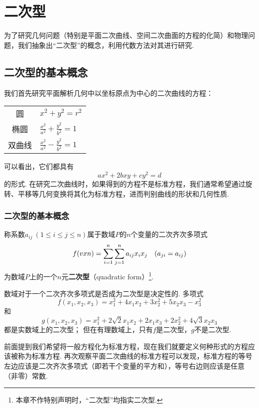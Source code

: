 \chapter{二次型}
为了研究几何问题（特别是平面二次曲线、空间二次曲面的方程的化简）和物理问题，我们抽象出“二次型”的概念，利用代数方法对其进行研究.

\section{二次型的基本概念}
我们首先研究平面解析几何中以坐标原点为中心的二次曲线的方程：
\begin{center}
\def\arraystretch{1.5}
\begin{tabular}{cl}
圆 & \(x^2+y^2=r^2\) \\
椭圆 & \(\frac{x^2}{a^2}+\frac{y^2}{b^2}=1\) \\
双曲线 & \(\frac{x^2}{a^2}-\frac{y^2}{b^2}=1\) \\
\end{tabular}
\end{center}

可以看出，它们都具有\[
a x^2 + 2b xy + c y^2 = d
\]的形式.
在研究二次曲线时，如果得到的方程不是标准方程，我们通常希望通过旋转、平移等几何变换将其化为标准方程，进而判别曲线的形状和几何性质.

\subsection{二次型的基本概念}
\begin{definition}
称系数\(a_{ij}\ (1 \leqslant i \leqslant j \leqslant n)\)属于数域\(P\)的\(n\)个变量的二次齐次多项式\begin{equation}\label{equation:二次型.二次型}
f(v{x}{n})
= \sum\limits_{i=1}^n \sum\limits_{j=1}^n a_{ij} x_i x_j
\quad(a_{ji}=a_{ij})
\end{equation}为数域\(P\)上的一个\(n\)元\textbf{二次型}（quadratic form）\footnote{%
本章不作特别声明时，“二次型”均指实二次型.}.
\end{definition}

数域对于一个二次齐次多项式是否成为二次型是决定性的.
多项式\[
f(x_1,x_2,x_3) = x_1^2 + 4 x_1 x_2 + 3 x_2^2 + 5 x_2 x_3 - x_3^2
\]和\[
g(x_1,x_2,x_3) = x_1^2 + 2\sqrt{2} x_1 x_2 + 2 x_1 x_3 + 2 x_2^2 + 4\sqrt{3} x_2 x_3
\]都是实数域上的二次型；
但在有理数域上，只有\(f\)是二次型，\(g\)不是二次型.

前面提到我们希望将一般方程化为标准方程，现在我们就要定义何种形式的方程应该被称为标准方程.
再次观察平面二次曲线的标准方程可以发现，标准方程的等号左边应该是二次齐次多项式（即若干个变量的平方和），等号右边则应该是任意（非零）常数.

